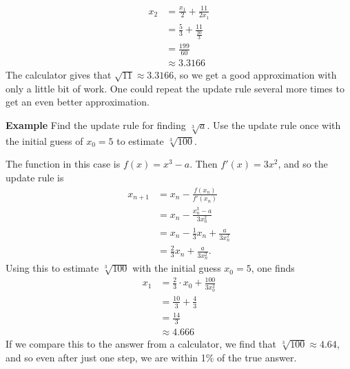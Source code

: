 \documentclass[twoside,openright,titlepage,a4paper]{book}
\begin{document}
\begin{sloppypar}
\begin{examplebox}
\begin{align*}
x_2 &= \frac{x_1}{2} + \frac{11}{2x_1} \\
&= \frac{5}{3} + \frac{11}{\frac{20}{3}} \\
&= \frac{199}{60} \\
& \approx 3.3166 
\end{align*}
The calculator gives that $\sqrt{11} \approx 3.3166$, so we get a good approximation with only a little bit of work. One could repeat the update rule several more times to get an even better approximation.	
\end{examplebox}
\bigbreak
\textbf{Example} Find the update rule for finding $\sqrt[3]{a}$. Use the update rule once with the initial guess of $x_0 = 5$ to estimate $\sqrt[3]{100}$.
\begin{examplebox}
The function in this case is $f(x) = x^3-a$. Then $f'(x) = 3x^2$, and so the update rule is
\begin{align*}
x_{n+1} &= x_n - \frac{f(x_n)}{f'(x_n)} \\
&= x_n - \frac{x_n^3-a}{3x_n^2} \\
&= x_n - \frac{1}{3}x_n + \frac{a}{3x_n^2} \\
&= \frac{2}{3}x_n + \frac{a}{3x_n^2}.
\end{align*}
Using this to estimate $\sqrt[3]{100}$ with the initial guess $x_0 = 5$, one finds
\begin{align*}
x_1 &= \frac{2}{3}\cdot x_0 + \frac{100}{3 x_0^2} \\
&= \frac{10}{3} + \frac{4}{3} \\
&= \frac{14}{3} \\
& \approx 4.666
\end{align*}
If we compare this to the answer from a calculator, we find that $\sqrt[3]{100} \approx 4.64$, and so even after just one step, we are within 1\% of the true answer.	
\end{examplebox}
		

\end{sloppypar}
\end{document}
